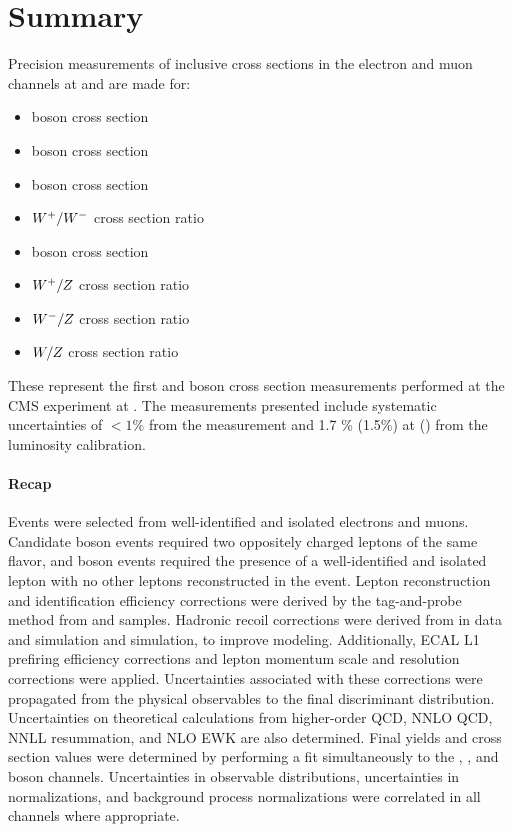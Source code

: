 \chapter{Summary}
Precision measurements of inclusive cross sections in the electron and muon channels at \sg and \sh are made for:
\begin{itemize}
    \item \Wp boson cross section
    \item \Wm boson cross section
    \item \W boson cross section
    \item $W^+/W^-$ cross section ratio
    \item \Z boson cross section
    \item $W^+/Z$ cross section ratio
    \item $W^-/Z$ cross section ratio
    \item $W/Z$ cross section ratio
\end{itemize}
These represent the first \W and \Z boson cross section measurements performed at the CMS experiment at \sg. The measurements presented include systematic uncertainties of $< 1\%$ from the measurement and 1.7 \% (1.5\%) at \sh (\sg) from the luminosity calibration. \\
\subsubsection{Recap}
Events were selected from well-identified and isolated electrons and muons. Candidate \Z boson events required two oppositely charged leptons of the same flavor, and \W boson events required the presence of a well-identified and isolated lepton with no other leptons reconstructed in the event.
Lepton reconstruction and identification efficiency corrections were derived by the tag-and-probe method from \zee and \zmm samples. Hadronic recoil corrections were derived from \zmm in data and simulation and \wmunu simulation, to improve \met modeling. Additionally, ECAL L1 prefiring efficiency corrections and lepton momentum scale and resolution corrections were applied. Uncertainties associated with these corrections were propagated from the physical observables to the final discriminant distribution. Uncertainties on theoretical calculations from higher-order QCD, NNLO QCD, NNLL resummation, and NLO EWK are also determined.
Final yields and cross section values were determined by performing a fit simultaneously to the \Wp, \Wm, and \Z boson channels. Uncertainties in observable distributions, uncertainties in normalizations, and background process normalizations were correlated in all channels where appropriate.\\
